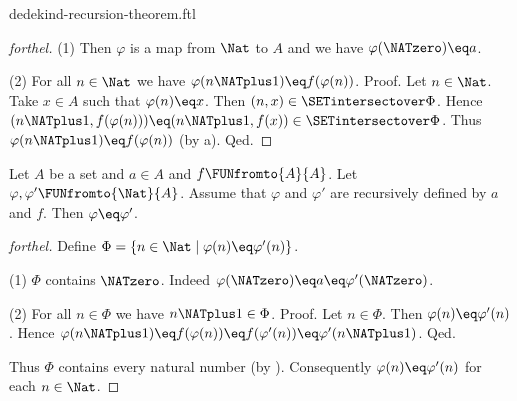 \documentclass{naproche-library}
\begin{document}
\begin{smodule}[title=Dedekind's Recursion Theorem]{dedekind-recursion-theorem.ftl}
\begin{proof}[forthel]
  (1) Then $\varphi$ is a map from $\Nat$ to $A$ and we have
  $\varphi(\NATzero) \eq a$.

  (2) For all $n \in \Nat$ we have $\varphi(n \NATplus 1) \eq
  f(\varphi(n))$. \newline
  Proof.
    Let $n \in \Nat$.
    Take $x \in A$ such that $\varphi(n) \eq x$.
    Then $(n, x) \in \SETintersectover \Phi$.
    Hence $(n \NATplus 1, f(\varphi(n))) \eq (n \NATplus 1, f(x)) \in \SETintersectover \Phi$.
    Thus $\varphi(n \NATplus 1) \eq f(\varphi(n))$ (by a).
  Qed.
\end{proof}

\begin{theorem}[forthel,title=Dedekind's Recursion Theorem: Uniqueness,id=dedekind_uniqueness]
  Let $A$ be a set and $a \in A$ and $f \FUNfromto{A}{A}$.
  Let $\varphi, \varphi' \FUNfromto{\Nat}{A}$.
  Assume that $\varphi$ and $\varphi'$ are recursively defined by $a$ and
  $f$.
  Then $\varphi \eq \varphi'$.
\end{theorem}
\begin{proof}[forthel]
  Define $\Phi = \{ n \in \Nat \mid \varphi(n) \eq \varphi'(n) \}$.

  (1) $\Phi$ contains $\NATzero$.
  Indeed $\varphi(\NATzero) \eq a \eq \varphi'(\NATzero)$.

  (2) For all $n \in \Phi$ we have $n \NATplus 1 \in \Phi$. \newline
  Proof.
    Let $n \in \Phi$.
    Then $\varphi(n) \eq \varphi'(n)$.
    Hence $\varphi(n \NATplus 1)
      \eq f(\varphi(n))
      \eq f(\varphi'(n))
      \eq \varphi'(n \NATplus 1)$.
  Qed.

  Thus $\Phi$ contains every natural number (by ).
  Consequently $\varphi(n) \eq \varphi'(n)$ for each $n \in \Nat$.
\end{proof}
\end{smodule}
\end{document}
